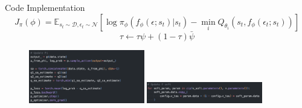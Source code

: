 \documentclass[8pt]{beamer}
\begin{document}
\begin{frame}{Code Implementation}
    \begin{equation*}
        J_\pi (\phi) = \mathbb{E}_{s_t \sim \mathcal{D}, \epsilon_t \sim \mathcal{N}} [\log{\pi_\phi (f_\phi (\epsilon; s_t)| s_t)} - \min_i Q_{\theta_i} (s_t, f_\phi(\epsilon_t ; s_t)) ]
    \end{equation*}
    \[
        \tau \leftarrow \tau \psi + (1- \tau)\bar{\psi}
     \]
    \begin{figure}
        \centering
        \includegraphics[width=0.45\textwidth]{fig6.png}
        \includegraphics[width=0.45\textwidth]{fig7.png}
    \end{figure}
\end{frame}
\end{document}
